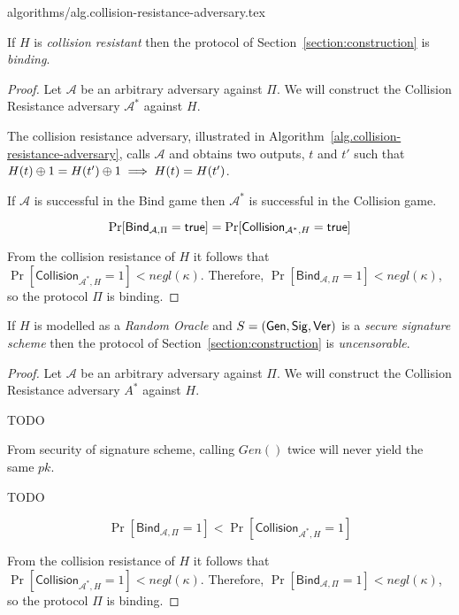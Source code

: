 {algorithms/alg.collision-resistance-adversary.tex}

\begin{theorem}[Binding]
  If $H$ is \emph{collision resistant} then the protocol of Section~\ref{section:construction} is \emph{binding}.
\end{theorem}
\begin{proof}
  Let $\mathcal{A}$ be an arbitrary adversary against $\Pi$.
  We will construct the Collision Resistance adversary $\mathcal{A}^*$ against $H$.

  The collision resistance adversary, illustrated in Algorithm~\ref{alg.collision-resistance-adversary}, calls $\mathcal{A}$ and obtains two outputs, $t$ and $t'$ such that $H(t) \oplus 1 = H(t') \oplus 1 \implies H(t) = H(t')$.

  If $\mathcal{A}$ is successful in the \textsf{Bind} game then $\mathcal{A^*}$ is successful in the \textsf{Collision} game.

  \[
    \Pr[\textsf{Bind}_{\mathcal{A},\Pi} = \mathsf{true}]
    =
    \Pr[\textsf{Collision}_{\mathcal{A}^*,H} = \mathsf{true}]
  \]

  From the collision resistance of $H$ it follows that $\Pr[\textsf{Collision}_{\mathcal{A}^*,H} = 1] < negl(\kappa)$. Therefore,
  $\Pr[\textsf{Bind}_{\mathcal{A},\Pi} = 1] < negl(\kappa)$, so
  the protocol $\Pi$ is binding.
\end{proof}

\begin{theorem}
  If $H$ is modelled as a \emph{Random Oracle} and $S = (\mathsf{Gen}, \mathsf{Sig}, \mathsf{Ver})$ is a \emph{secure signature scheme} then the protocol of Section~\ref{section:construction} is \emph{uncensorable}.
\end{theorem}
\begin{proof}
  Let $\mathcal{A}$ be an arbitrary adversary against $\Pi$.
  We will construct the Collision Resistance adversary $A^*$ against $H$.

  TODO

  From security of signature scheme, calling $Gen()$ twice will never yield the same $pk$.

  TODO

  \[
    \Pr[\textsf{Bind}_{\mathcal{A},\Pi} = 1]
    <
    \Pr[\textsf{Collision}_{\mathcal{A}^*,H} = 1]
  \]

  From the collision resistance of $H$ it follows that $\Pr[\textsf{Collision}_{\mathcal{A}^*,H} = 1] < negl(\kappa)$. Therefore,
  $\Pr[\textsf{Bind}_{\mathcal{A},\Pi} = 1] < negl(\kappa)$, so
  the protocol $\Pi$ is binding.
\end{proof}
